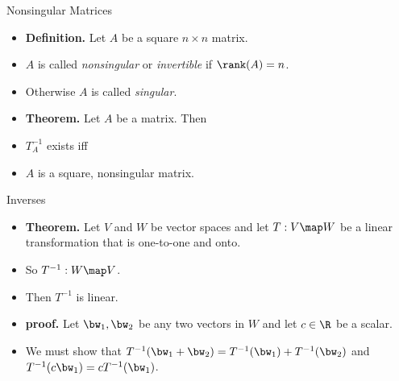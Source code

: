 \documentclass{beamer}
\begin{document}
\begin{frame}{Nonsingular Matrices}

\begin{itemize}
\item \textbf{Definition.} Let $A$ be a square $n\times n$ matrix.
\item $A$ is called \emph{nonsingular} or \emph{invertible} if $\rank(A)=n$.
\item Otherwise $A$ is called \emph{singular}.
\item \textbf{Theorem.} Let $A$ be a matrix. Then
\item $T_A^{-1}$ exists iff
\item $A$ is a square, nonsingular matrix.
\end{itemize}
\end{frame}


\begin{frame}{Inverses}

\begin{itemize}
\item \textbf{Theorem.} Let $V$ and $W$ be vector spaces and let
$T:V\map W$ be a linear transformation that is one-to-one and onto.
\item So $T^{-1}:W\map V$.
\item Then $T^{-1}$ is linear.
\item \textbf{proof.} Let $\bw_1,\bw_2$ be any two vectors in $W$ and let
$c\in\R$ be a scalar.
\item We must show that $T^{-1}(\bw_1+\bw_2) = T^{-1}(\bw_1) + T^{-1}(\bw_2)$
and $T^{-1}(c\bw_1) = cT^{-1}(\bw_1)$.
\end{itemize}
\end{frame}

\end{document}
